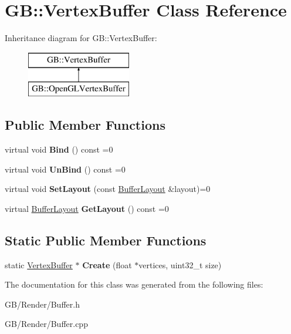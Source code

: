 \hypertarget{class_g_b_1_1_vertex_buffer}{}\section{GB\+::Vertex\+Buffer Class Reference}
\label{class_g_b_1_1_vertex_buffer}
Inheritance diagram for GB\+::Vertex\+Buffer\+:\begin{figure}[H]
\begin{center}
\leavevmode
\includegraphics[height=2.000000cm]{class_g_b_1_1_vertex_buffer}
\end{center}
\end{figure}
\subsection*{Public Member Functions}
\begin{DoxyCompactItemize}
\item 
\mbox{\label{class_g_b_1_1_vertex_buffer_aebb91f93c519d5fef6d4d67642a477f6}} 
virtual void {\bfseries Bind} () const =0
\item 
\mbox{\label{class_g_b_1_1_vertex_buffer_a4afeb42cf8c71158de2edd5663f242bc}} 
virtual void {\bfseries Un\+Bind} () const =0
\item 
\mbox{\label{class_g_b_1_1_vertex_buffer_a83e547f04cdc44b614ef935101769afa}} 
virtual void {\bfseries Set\+Layout} (const \mbox{\hyperlink{class_g_b_1_1_buffer_layout}{Buffer\+Layout}} \&layout)=0
\item 
\mbox{\label{class_g_b_1_1_vertex_buffer_adf9d72628cef9475a236ae93b9e0c4b0}} 
virtual \mbox{\hyperlink{class_g_b_1_1_buffer_layout}{Buffer\+Layout}} {\bfseries Get\+Layout} () const =0
\end{DoxyCompactItemize}
\subsection*{Static Public Member Functions}
\begin{DoxyCompactItemize}
\item 
\mbox{\label{class_g_b_1_1_vertex_buffer_a55e51ed709d5f25798d1723dcbfc2420}} 
static \mbox{\hyperlink{class_g_b_1_1_vertex_buffer}{Vertex\+Buffer}} $\ast$ {\bfseries Create} (float $\ast$vertices, uint32\+\_\+t size)
\end{DoxyCompactItemize}


The documentation for this class was generated from the following files\+:\begin{DoxyCompactItemize}
\item 
G\+B/\+Render/Buffer.\+h\item 
G\+B/\+Render/Buffer.\+cpp\end{DoxyCompactItemize}

